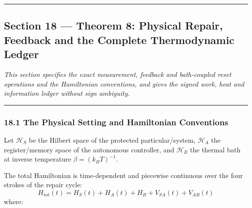 \documentclass[
]{article}
\begin{document}
\begin{center}\rule{0.5\linewidth}{0.5pt}\end{center}

\subsection{Section 18 --- Theorem 8: Physical Repair, Feedback and the
Complete Thermodynamic
Ledger}\label{section-18-theorem-8-physical-repair-feedback-and-the-complete-thermodynamic-ledger}

\emph{This section specifies the exact measurement, feedback and
bath-coupled reset operations and the Hamiltonian conventions, and gives
the signed work, heat and information ledger without sign ambiguity.}

\begin{center}\rule{0.5\linewidth}{0.5pt}\end{center}

\subsubsection{18.1 The Physical Setting and Hamiltonian
Conventions}\label{the-physical-setting-and-hamiltonian-conventions}

Let \(\mathcal{H}_S\) be the Hilbert space of the protected
p\allowbreak{}a\allowbreak{}r\allowbreak{}t\allowbreak{}i\allowbreak{}c\allowbreak{}u\allowbreak{}l\allowbreak{}a\allowbreak{}r\allowbreak{}/\allowbreak{}s\allowbreak{}y\allowbreak{}s\allowbreak{}t\allowbreak{}e\allowbreak{}m\allowbreak{},
\(\mathcal{H}_A\) the
r\allowbreak{}e\allowbreak{}g\allowbreak{}i\allowbreak{}s\allowbreak{}t\allowbreak{}e\allowbreak{}r\allowbreak{}/\allowbreak{}m\allowbreak{}e\allowbreak{}m\allowbreak{}o\allowbreak{}r\allowbreak{}y
space of the autonomous controller, and \(\mathcal{H}_B\) the thermal
bath at inverse temperature \(\beta = (k_B T)^{-1}\).

The total Hamiltonian is time-dependent and piecewise continuous over
the four strokes of the repair cycle:
\[H_{\mathrm{tot}}(t) = H_S(t) + H_A(t) + H_B + V_{SA}(t) + V_{AB}(t)\]
where:
\end{document}
